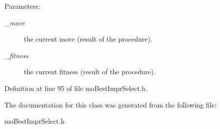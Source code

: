 \begin{Desc}
\item[Parameters:]
\begin{description}
\item[{\em \_\-move}]the current move (result of the procedure). \item[{\em \_\-fitness}]the current fitness (result of the procedure). \end{description}
\end{Desc}


Definition at line 95 of file mo\-Best\-Impr\-Select.h.

The documentation for this class was generated from the following file:\begin{CompactItemize}
\item 
mo\-Best\-Impr\-Select.h\end{CompactItemize}
